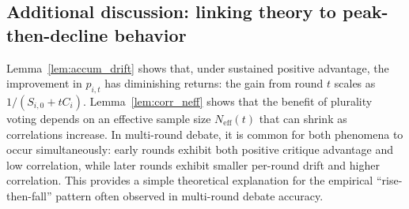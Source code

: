 \subsection{Additional discussion: linking theory to peak-then-decline behavior}
\label{app:discussion_peak}

Lemma~\ref{lem:accum_drift} shows that, under sustained positive advantage, the improvement in \(p_{i,t}\)
has diminishing returns: the gain from round \(t\) scales as \(1/(S_{i,0}+tC_i)\).
Lemma~\ref{lem:corr_neff} shows that the benefit of plurality voting depends on an effective sample size
\(N_{\mathrm{eff}}(t)\) that can shrink as correlations increase.
In multi-round debate, it is common for both phenomena to occur simultaneously:
early rounds exhibit both positive critique advantage and low correlation,
while later rounds exhibit smaller per-round drift and higher correlation.
This provides a simple theoretical explanation for the empirical ``rise-then-fall'' pattern
often observed in multi-round debate accuracy.

